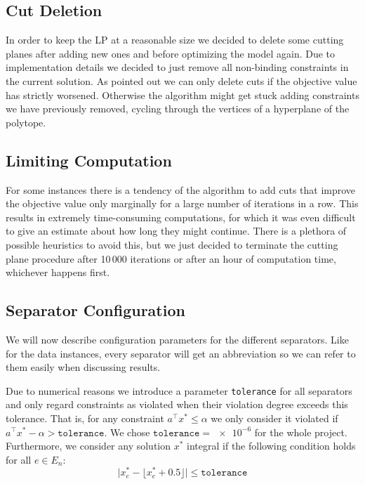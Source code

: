 \subsection{Cut Deletion}\label{subsec:cut_deletion}
In order to keep the LP at a reasonable size we decided to delete some cutting planes after adding new ones and before optimizing the model again.
Due to implementation details we decided to just remove all non-binding constraints in the current solution.
As \cite{sorensenSeparationHeuristic2Partition2020} pointed out we can only delete cuts if the objective value has strictly worsened.
Otherwise the algorithm might get stuck adding constraints we have previously removed, cycling through the vertices of a hyperplane of the polytope.

\subsection{Limiting Computation}\label{subsec:limiting_computation}
For some instances there is a tendency of the algorithm to add cuts that improve the objective value only marginally for a large number of iterations in a row.
This results in extremely time-consuming computations, for which it was even difficult to give an estimate about how long they might continue.
There is a plethora of possible heuristics to avoid this, but we just decided to terminate the cutting plane procedure after 10\,000 iterations or after an hour of computation time, whichever happens first.

\subsection{Separator Configuration}\label{subsec:run_configs}
We will now describe configuration parameters for the different separators.
Like for the data instances, every separator will get an abbreviation so we can refer to them easily when discussing results.

Due to numerical reasons we introduce a parameter \texttt{tolerance} for all separators and only regard constraints as violated when their violation degree exceeds this tolerance.
That is, for any constraint $a^{\top} x^{*} \leq \alpha$ we only consider it violated if $a^{\top} x^{*} - \alpha > \texttt{tolerance}$.
We chose $\texttt{tolerance} = \num{e-6}$ for the whole project.
Furthermore, we consider any solution $x^{*}$ integral if the following condition holds for all $e \in E_{n}$:
\[
 \big\lvert x_{e}^{*} - \lfloor x_{e}^{*} + 0.5 \rfloor \big\rvert \leq \texttt{tolerance}
\]

